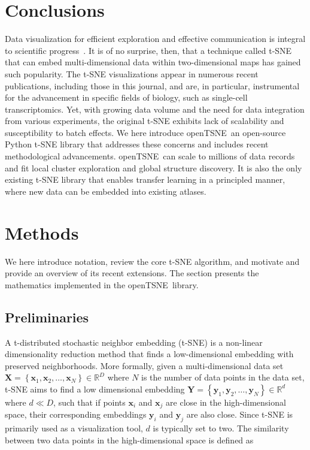 \documentclass[twocolumn]{bmcart}
\newcommand{\opentsne}{\textsf{openTSNE}}
\begin{document}
\section*{Conclusions}

Data visualization for efficient exploration and effective communication is integral to scientific progress~\cite{wong2012points}. It is of no surprise, then, that a technique called t-SNE that can embed multi-dimensional data within two-dimensional maps has gained such popularity. The t-SNE visualizations appear in numerous recent publications, including those in this journal, and are, in particular, instrumental for the advancement in specific fields of biology, such as single-cell transcriptomics. Yet, with growing data volume and the need for data integration from various experiments, the original t-SNE exhibits lack of scalability and susceptibility to batch effects. We here introduce \opentsne\, an open-source Python t-SNE library that addresses these concerns and includes recent methodological advancements. \opentsne\ can scale to millions of data records and fit local cluster exploration and global structure discovery. It is also the only existing t-SNE library that enables transfer learning in a principled manner, where new data can be embedded into existing atlases.



\section*{Methods}

We here introduce notation, review the core t-SNE algorithm, and motivate and provide an overview of its recent extensions. The section presents the mathematics implemented in the \opentsne\ library.

\subsection*{Preliminaries}

A t-distributed stochastic neighbor embedding (t-SNE) is a non-linear dimensionality reduction method that finds a low-dimensional embedding with preserved neighborhoods. More formally, given a multi-dimensional data set $\mathbf{X} = \left \{ \mathbf{x}_1, \mathbf{x}_2, \dots, \mathbf{x}_N \right \} \in \mathbb{R}^D$ where $N$ is the number of data points in the data set, t-SNE aims to find a low dimensional embedding $\mathbf{Y} = \left \{ \mathbf{y}_1, \mathbf{y}_2, \dots, \mathbf{y}_N \right\} \in \mathbb{R}^d$ where $d \ll D$, such that if points $\mathbf{x}_i$ and $\mathbf{x}_j$ are close in the high-dimensional space, their corresponding embeddings $\mathbf{y}_i$ and $\mathbf{y}_j$ are also close. Since t-SNE is primarily used as a visualization tool, $d$ is typically set to two. The similarity between two data points in the high-dimensional space is defined as
\end{document}

